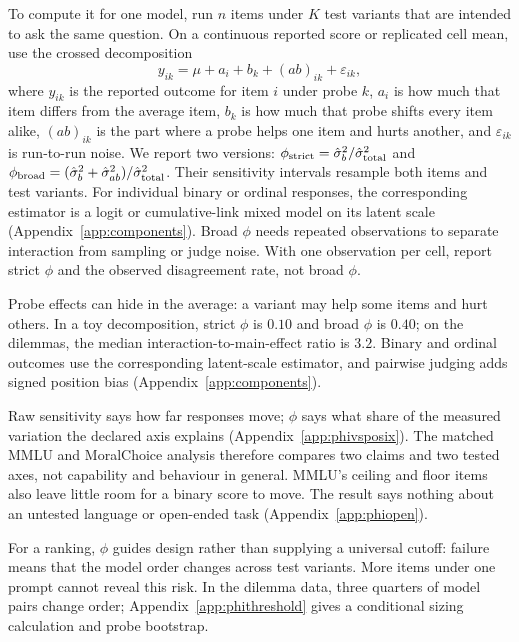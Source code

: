 \documentclass[11pt]{article}
\begin{document}
To compute it for one model, run $n$ items under $K$ test variants that are
intended to ask the same question. On a continuous reported score or replicated
cell mean, use the crossed decomposition
\begin{equation}
y_{ik}=\mu+a_i+b_k+(ab)_{ik}+\varepsilon_{ik},
\label{eq:phimodel}
\end{equation}
where $y_{ik}$ is the reported outcome for item $i$ under probe $k$, $a_i$ is how much
that item differs from the average item, $b_k$ is how much that probe shifts
every item alike, $(ab)_{ik}$ is the part where a probe helps one item and hurts
another, and $\varepsilon_{ik}$ is run-to-run noise. We report two versions:
$\phi_{\text{strict}}=\hat\sigma^2_b/\hat\sigma^2_{\rm total}$ and
$\phi_{\text{broad}}=(\hat\sigma^2_b+\hat\sigma^2_{ab})/
\hat\sigma^2_{\rm total}$. Their sensitivity intervals resample both items and
test variants. For individual binary or ordinal responses, the corresponding
estimator is a logit or cumulative-link mixed model on its latent scale
(Appendix~\ref{app:components}). Broad $\phi$ needs repeated observations to
separate interaction from sampling or judge noise. With one observation per
cell, report strict $\phi$ and the observed disagreement rate, not broad $\phi$.

Probe effects can hide in the average: a variant may help some items and hurt
others. In a toy decomposition, strict $\phi$ is $0.10$ and broad $\phi$ is
$0.40$; on the dilemmas, the median interaction-to-main-effect ratio is $3.2$.
Binary and ordinal outcomes use the corresponding latent-scale estimator, and
pairwise judging adds signed position bias (Appendix~\ref{app:components}).

Raw sensitivity says how far responses move; $\phi$ says what share of the
measured variation the declared axis explains (Appendix~\ref{app:phivsposix}).
The matched MMLU and MoralChoice analysis therefore compares two claims and two
tested axes, not capability and behaviour in general. MMLU's ceiling and floor
items also leave little room for a binary score to move. The result says nothing
about an untested language or open-ended task (Appendix~\ref{app:phiopen}).

For a ranking, $\phi$ guides design rather than supplying a universal cutoff:
failure means that the model order changes across test variants. More items
under one prompt cannot reveal this risk. In the dilemma data, three quarters of
model pairs change order; Appendix~\ref{app:phithreshold} gives a conditional
sizing calculation and probe bootstrap.
\end{document}
